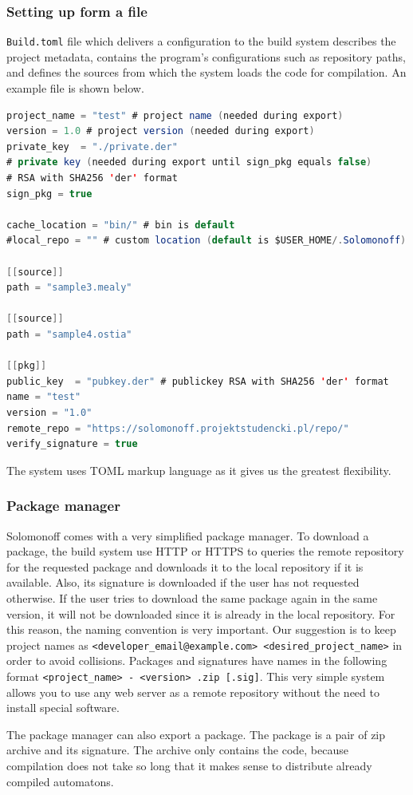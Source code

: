 \hypertarget{setting-up-form-a-file}{%
\subsubsection{Setting up form a file}\label{setting-up-form-a-file}}

\texttt{Build.toml} file which delivers a configuration to the build system
describes the project metadata, contains the program's configurations
such as repository paths, and defines the sources from which the system
loads the code for compilation. An example file is shown below.

\begin{lstlisting}[language=Java]
project_name = "test" # project name (needed during export)
version = 1.0 # project version (needed during export)
private_key  = "./private.der" 
# private key (needed during export until sign_pkg equals false) 
# RSA with SHA256 'der' format
sign_pkg = true

cache_location = "bin/" # bin is default 
#local_repo = "" # custom location (default is $USER_HOME/.Solomonoff)

[[source]]
path = "sample3.mealy"

[[source]]
path = "sample4.ostia"

[[pkg]]
public_key  = "pubkey.der" # publickey RSA with SHA256 'der' format
name = "test" 
version = "1.0"
remote_repo = "https://solomonoff.projektstudencki.pl/repo/"
verify_signature = true
\end{lstlisting}

The system uses TOML markup language as it gives us the greatest
flexibility.

\hypertarget{package-manager}{%
\subsubsection{Package manager}\label{package-manager}}

Solomonoff comes with a very simplified package manager. To download a
package, the build system use HTTP or HTTPS to queries the remote
repository for the requested package and downloads it to the local
repository if it is available. Also, its signature is downloaded if the
user has not requested otherwise. If the user tries to download the same
package again in the same version, it will not be downloaded since it is
already in the local repository. For this reason, the naming convention
is very important. Our suggestion is to keep project names as
\texttt{\textless{}developer\_email@example.com\textgreater{}\ \textless{}desired\_project\_name\textgreater{}}
in order to avoid collisions. Packages and signatures have names in the
following format
\texttt{\textless{}project\_name\textgreater{}\ -\ \textless{}version\textgreater{}\ .zip\ {[}.sig{]}}.
This very simple system allows you to use any web server as a remote
repository without the need to install special software. 

The package manager can also export a package. The package is a pair of zip archive
and its signature. The archive only contains the code, because
compilation does not take so long that it makes sense to distribute
already compiled automatons.
